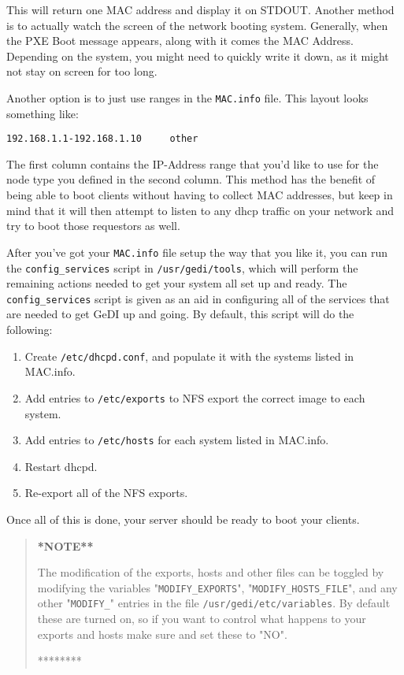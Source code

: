 \documentclass[10pt,a4paper,titlepage]{article}
\begin{document}
This will return one MAC address and display it on STDOUT.  Another method is to
actually watch the screen of the network booting system.  Generally, when the
PXE Boot message appears, along with it comes the MAC Address.  Depending on the
system, you might need to quickly write it down, as it might not stay on screen
for too long.

Another option is to just use ranges in the \verb!MAC.info! file.  This layout
looks something like:

\begin{verbatim}
192.168.1.1-192.168.1.10     other
\end{verbatim}

The first column contains the IP-Address range that you'd like to use for the
node type you defined in the second column.  This method has the benefit of
being able to boot clients without having to collect MAC addresses, but keep
in mind that it will then attempt to listen to any dhcp traffic on your network
and try to boot those requestors as well.

After you've got your \verb!MAC.info! file setup the way that you like it, you
can run the \verb!config_services! script in \verb!/usr/gedi/tools!, which will
perform the remaining actions needed to get your system all set up and ready.
The \verb!config_services! script is given as an aid in configuring all of the
services that are needed to get GeDI up and going.  By default, this script will
do the following:

\begin{enumerate}
\parskip=0pt
\item Create \verb!/etc/dhcpd.conf!, and populate it with the systems listed in MAC.info.
\item Add entries to \verb!/etc/exports! to NFS export the correct image to each system.
\item Add entries to \verb!/etc/hosts! for each system listed in MAC.info.
\item Restart dhcpd.
\item Re-export all of the NFS exports.
\end{enumerate}

Once all of this is done, your server should be ready to boot your clients.

\begin{quote}
\bf**NOTE**\par
The modification of the exports, hosts and other files can be toggled by
modifying the variables "\verb!MODIFY_EXPORTS!", "\verb!MODIFY_HOSTS_FILE!", and
any other "\verb!MODIFY_!" entries in the file \verb!/usr/gedi/etc/variables!.
By default these are turned on, so if you want to control what happens to your
exports and hosts make sure and set these to "NO".\par
********
\end{quote}
\end{document}
